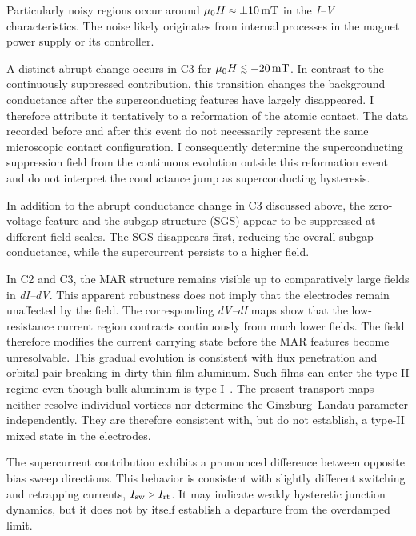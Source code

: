         Particularly noisy regions occur around $\mu_0H\sapprox\pm\qty{10}{\milli\tesla}$ in the \textit{I--V} characteristics. The noise likely originates from internal processes in the magnet power supply or its controller.

        A distinct abrupt change occurs in C3 for $\mu_0H\slesssim\qty{-20}{\milli\tesla}$. In contrast to the continuously suppressed contribution, this transition changes the background conductance after the superconducting features have largely disappeared. I therefore attribute it tentatively to a reformation of the atomic contact. The data recorded before and after this event do not necessarily represent the same microscopic contact configuration. I consequently determine the superconducting suppression field from the continuous evolution outside this reformation event and do not interpret the conductance jump as superconducting hysteresis.

        In addition to the abrupt conductance change in C3 discussed above, the zero-voltage feature and the subgap structure (SGS) appear to be suppressed at different field scales. The SGS disappears first, reducing the overall subgap conductance, while the supercurrent persists to a higher field.

        In C2 and C3, the MAR structure remains visible up to comparatively large fields in \textit{dI--dV}. This apparent robustness does not imply that the electrodes remain unaffected by the field. The corresponding \textit{dV--dI} maps show that the low-resistance current region contracts continuously from much lower fields. The field therefore modifies the current carrying state before the MAR features become unresolvable. This gradual evolution is consistent with flux penetration and orbital pair breaking in dirty thin-film aluminum. Such films can enter the type-II regime even though bulk aluminum is type I~\cite{lopez-nunez_magnetic_2025}. The present transport maps neither resolve individual vortices nor determine the Ginzburg--Landau parameter independently. They are therefore consistent with, but do not establish, a type-II mixed state in the electrodes.

        The supercurrent contribution exhibits a pronounced difference between opposite bias sweep directions. This behavior is consistent with slightly different switching and retrapping currents, $I_\mathrm{sw}\sgt{}I_\mathrm{rt}$. It may indicate weakly hysteretic junction dynamics, but it does not by itself establish a departure from the overdamped limit.

